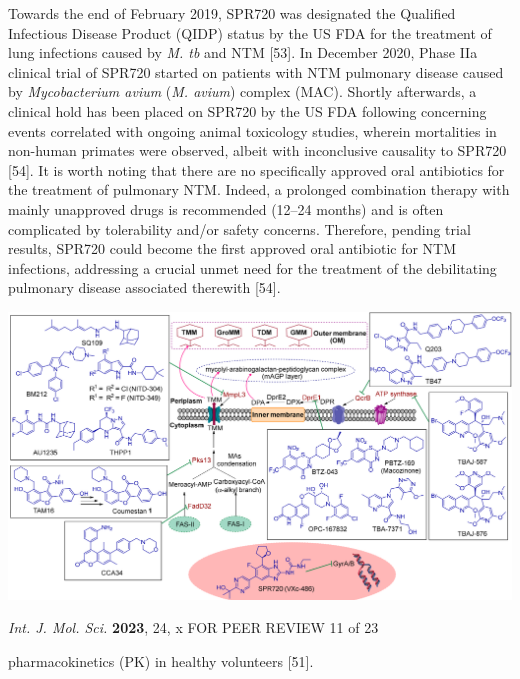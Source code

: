 \documentclass{article}
\begin{document}
Towards the end of February 2019, SPR720 was designated the Qualified Infectious Disease Product (QIDP) status by the US FDA for the treatment of lung infections caused by \textit{M. tb} and NTM [53]. In December 2020, Phase IIa clinical trial of SPR720 started on patients with NTM pulmonary disease caused by \textit{Mycobacterium avium} (\textit{M. avium}) complex (MAC). Shortly afterwards, a clinical hold has been placed on SPR720 by the US FDA following concerning events correlated with ongoing animal toxicology studies, wherein mortalities in non-human primates were observed, albeit with inconclusive causality to SPR720 [54]. It is worth noting that there are no specifically approved oral antibiotics for the treatment of pulmonary NTM. Indeed, a prolonged combination therapy with mainly unapproved drugs is recommended (12–24 months) and is often complicated by tolerability and/or safety concerns. Therefore, pending trial results, SPR720 could become the first approved oral antibiotic for NTM infections, addressing a crucial unmet need for the treatment of the debilitating pulmonary disease associated therewith [54].


\includegraphics{_page_10_Figure_2.png}


\textit{Int. J. Mol. Sci.} \textbf{2023}, 24, x FOR PEER REVIEW 11 of 23

pharmacokinetics (PK) in healthy volunteers [51].
\end{document}
